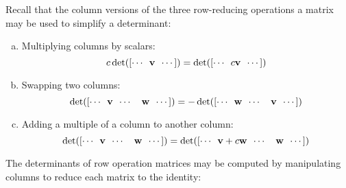 \begin{applicationActivities}

\begin{remark}
  Recall that the column versions of the three row-reducing operations
  a matrix may be used to simplify a determinant:
  \begin{enumerate}[(a)]
  \item Multiplying columns by scalars:
        \[c\det([\cdots\hspace{0.5em}\vec{v}\hspace{0.5em} \cdots])=
        \det([\cdots\hspace{0.5em}c\vec{v}\hspace{0.5em} \cdots])\]
  \item Swapping two columns:
        \[\det([\cdots\hspace{0.5em}\vec{v}\hspace{0.5em}
        \cdots\hspace{1em}\vec{w}\hspace{0.5em} \cdots])=
        -\det([\cdots\hspace{0.5em}\vec{w}\hspace{0.5em}
        \cdots\hspace{1em}\vec{v}\hspace{0.5em} \cdots])\]
  \item Adding a multiple of a column to another column:
        \[\det([\cdots\hspace{0.5em}\vec{v}\hspace{0.5em}
        \cdots\hspace{1em}\vec{w}\hspace{0.5em} \cdots])=
        \det([\cdots\hspace{0.5em}\vec{v}+c\vec{w}\hspace{0.5em}
        \cdots\hspace{1em}\vec{w}\hspace{0.5em} \cdots])\]
  \end{enumerate}
\end{remark}
\begin{remark}
The determinants of row operation matrices may be computed
by manipulating columns to reduce each matrix to the identity:
\end{remark}
\end{applicationActivities}
